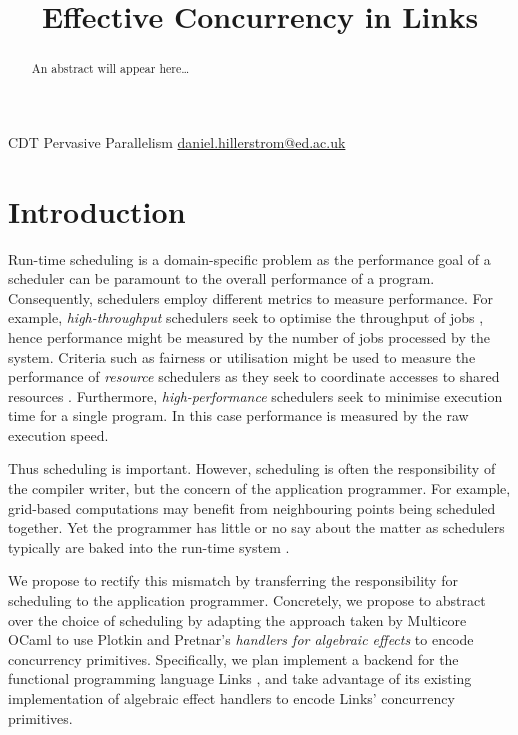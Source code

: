 \documentclass[preprint,10pt,numbers]{sigplanconf}
\begin{document}
\title{Effective Concurrency in Links}

           {CDT Pervasive Parallelism}
           {\href{mailto:daniel.hillerstrom@ed.ac.uk}{daniel.hillerstrom@ed.ac.uk}}
  \maketitle
  \begin{abstract}
    An abstract will appear here\dots
  \end{abstract}
  \section{Introduction}
Run-time scheduling is a domain-specific problem as the performance goal of a scheduler can be paramount to the overall performance of a program. Consequently, schedulers employ different metrics to measure performance. For example, \emph{high-throughput} schedulers seek to optimise the throughput of jobs \cite{Berman2003}, hence performance might be measured by the number of jobs processed by the system. Criteria such as fairness or utilisation might be used to measure the performance of \emph{resource} schedulers as they seek to coordinate accesses to shared resources \cite{Berman2003}. Furthermore, \emph{high-performance} schedulers seek to minimise execution time for a single program. In this case performance is measured by the raw execution speed.

Thus scheduling is important. However, scheduling is often the responsibility of the compiler writer, but the concern of the application programmer. For example, grid-based computations may benefit from neighbouring points being scheduled together. Yet the programmer has little or no say about the matter as schedulers typically are baked into the run-time system \cite{Dolan2015}. 

We propose to rectify this mismatch by transferring the responsibility for scheduling to the application programmer. Concretely, we propose to abstract over the choice of scheduling by adapting the approach taken by Multicore OCaml \cite{Dolan2015} to use Plotkin and Pretnar's \emph{handlers for algebraic effects} \cite{Plotkin2013} to encode concurrency primitives. Specifically, we plan implement a backend for the functional programming language Links \cite{Cooper2006}, and take advantage of its existing implementation of algebraic effect handlers \cite{Hillerstrom2015} to encode Links' concurrency primitives.
\end{document}
